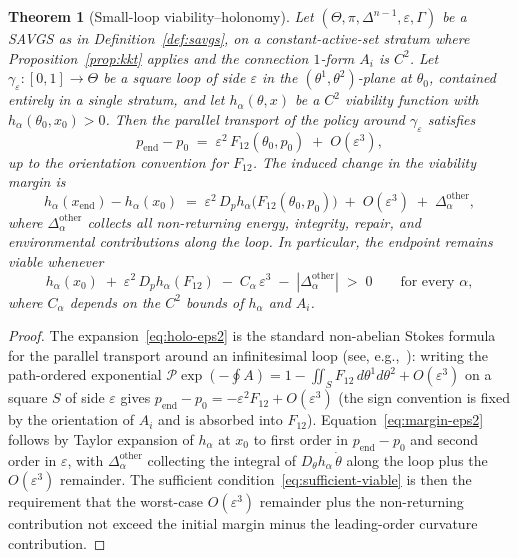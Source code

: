 \documentclass[11pt,a4paper]{article}
\theoremstyle{plain}
\newtheorem{theorem}{Theorem}[section]
\theoremstyle{definition}
\theoremstyle{remark}
\begin{document}
\begin{theorem}[Small-loop viability--holonomy]\label{thm:smallloop}
Let $(\Theta, \pi, \Delta^{n-1}, \varepsilon, \Gamma)$ be a SAVGS as in
Definition~\ref{def:savgs}, on a constant-active-set stratum where
Proposition~\ref{prop:kkt} applies and the connection $1$-form $A_i$
is $C^2$. Let $\gamma_\varepsilon : [0,1] \to \Theta$ be a square loop
of side $\varepsilon$ in the $(\theta^1, \theta^2)$-plane at
$\theta_0$, contained entirely in a single stratum, and let
$h_\alpha(\theta, x)$ be a $C^2$ viability function with
$h_\alpha(\theta_0, x_0) > 0$. Then the parallel transport of the
policy around $\gamma_\varepsilon$ satisfies
\begin{equation}\label{eq:holo-eps2}
  p_{\mathrm{end}} - p_0 \;=\; \varepsilon^2\,F_{12}(\theta_0, p_0) \;+\; O(\varepsilon^3),
\end{equation}
up to the orientation convention for $F_{12}$. The induced change in
the viability margin is
\begin{equation}\label{eq:margin-eps2}
  h_\alpha(x_{\mathrm{end}}) - h_\alpha(x_0)
  \;=\; \varepsilon^2\,D_p h_\alpha\bigl(F_{12}(\theta_0, p_0)\bigr)
  \;+\; O(\varepsilon^3) \;+\; \Delta_\alpha^{\mathrm{other}},
\end{equation}
where $\Delta_\alpha^{\mathrm{other}}$ collects all non-returning
energy, integrity, repair, and environmental contributions along the
loop. In particular, the endpoint remains viable whenever
\begin{equation}\label{eq:sufficient-viable}
  h_\alpha(x_0) \;+\; \varepsilon^2\,D_p h_\alpha(F_{12})
  \;-\; C_\alpha\,\varepsilon^3 \;-\; |\Delta_\alpha^{\mathrm{other}}|
  \;>\; 0
  \qquad\text{for every }\alpha,
\end{equation}
where $C_\alpha$ depends on the $C^2$ bounds of $h_\alpha$ and $A_i$.
\end{theorem}

\begin{proof}
The expansion~\eqref{eq:holo-eps2} is the standard non-abelian
Stokes formula for the parallel transport around an infinitesimal
loop (see, e.g.,~\cite{kobayashinomizu1969,misner1973}): writing
the path-ordered exponential
$\mathcal P\exp(-\oint A) = 1 - \iint_S F_{12}\,d\theta^1 d\theta^2
+ O(\varepsilon^3)$ on a square $S$ of side $\varepsilon$ gives
$p_{\mathrm{end}} - p_0 = -\varepsilon^2 F_{12} + O(\varepsilon^3)$
(the sign convention is fixed by the orientation of $A_i$ and is
absorbed into $F_{12}$). Equation~\eqref{eq:margin-eps2} follows by
Taylor expansion of $h_\alpha$ at $x_0$ to first order in
$p_{\mathrm{end}} - p_0$ and second order in $\varepsilon$, with
$\Delta_\alpha^{\mathrm{other}}$ collecting the integral of
$D_\theta h_\alpha\,\dot\theta$ along the loop plus the
$O(\varepsilon^3)$ remainder. The sufficient
condition~\eqref{eq:sufficient-viable} is then the requirement that
the worst-case $O(\varepsilon^3)$ remainder plus the non-returning
contribution not exceed the initial margin minus the leading-order
curvature contribution.
\end{proof}
\end{document}
